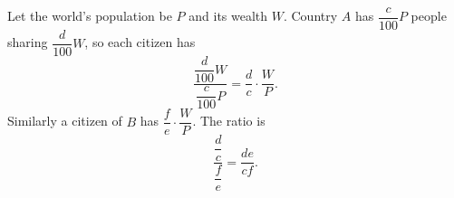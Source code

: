 Let the world's population be $P$ and its wealth $W$. Country $A$ has $\dfrac{c}{100}P$ people sharing $\dfrac{d}{100}W$, so each citizen has
\[\dfrac{\dfrac{d}{100}W}{\dfrac{c}{100}P}=\dfrac {d}{c}\cdot\dfrac {W}{P}.\]
Similarly a citizen of $B$ has $\dfrac {f}{e}\cdot\dfrac {W}{P}$. The ratio is
\[\dfrac{\dfrac {d}{c}}{\dfrac {f}{e}}=\boxed{\dfrac{de}{cf}}.\]
